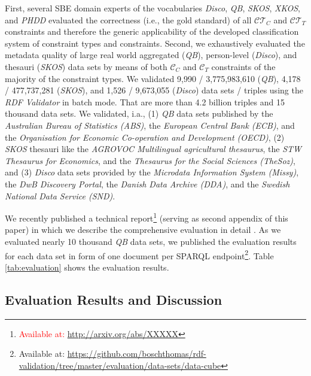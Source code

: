 \documentclass{llncs}
\begin{document}
{{First, several SBE domain experts of the vocabularies \emph{Disco}, \emph{QB}, \emph{SKOS}, \emph{XKOS}, and \emph{PHDD} evaluated the correctness (i.e., the gold standard) of all $\mathcal{CT}_{C}$ and $\mathcal{CT}_{T}$ constraints and therefore the generic applicability of the developed classification system of constraint types and constraints. 
Second, we exhaustively evaluated the metadata quality of large real world aggregated (\emph{QB}), person-level (\emph{Disco}), and thesauri (\emph{SKOS}) data sets by means of both $\mathcal{C}_{C}$ and $\mathcal{C}_{T}$ constraints of the majority of the constraint types.
We validated 
9,990 / 3,775,983,610 (\emph{QB}),
4,178 / 477,737,281 (\emph{SKOS}), and 
1,526 / 9,673,055 (\emph{Disco}) data sets / triples using the \emph{RDF Validator} in batch mode.
That are more than 4.2 billion triples and 15 thousand data sets.
We validated, i.a., 
(1) \emph{QB} data sets published by the \emph{Australian Bureau of Statistics (ABS)},
the \emph{European Central Bank (ECB)}, and the
\emph{Organisation for Economic Co-operation and Development (OECD)},
(2) \emph{SKOS} thesauri like the \emph{AGROVOC Multilingual agricultural thesaurus},
the \emph{STW Thesaurus for Economics}, and the
\emph{Thesaurus for the Social Sciences (TheSoz)}, and
(3) \emph{Disco} data sets provided by the \emph{Microdata Information System (Missy)}, 
the \emph{DwB Discovery Portal}, the
\emph{Danish Data Archive (DDA)}, and the
\emph{Swedish National Data Service (SND)}.

We recently published a technical report\footnote{\label{technical-report-2}\textcolor{red}{Available at: \url{http://arxiv.org/abs/XXXXX}}} (serving as second appendix of this paper) 
in which we describe the comprehensive evaluation in detail \cite{BoschZapilkoWackerowEckert2015-2}. 
As we evaluated nearly 10 thousand \emph{QB} data sets, we published the evaluation results for each data set in form of one document per SPARQL endpoint\footnote{Available at: \url{https://github.com/boschthomas/rdf-validation/tree/master/evaluation/data-sets/data-cube}}.
Table \ref{tab:evaluation} shows the evaluation results.

\subsection{Evaluation Results and Discussion}

}}
\end{document}
